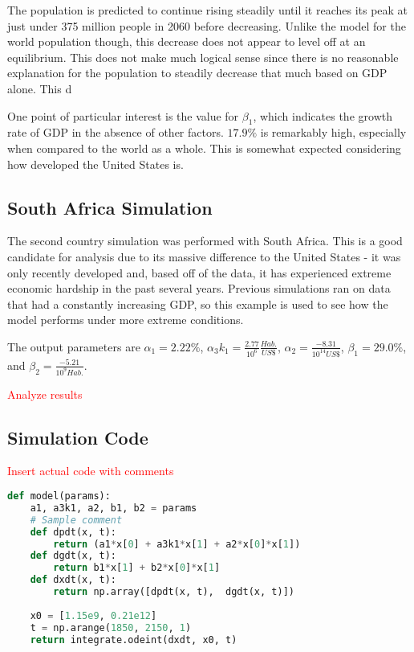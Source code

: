 \documentclass[a4paper]{article}
\newcommand{\todo}[1]{{\Large\textcolor{red}{#1}}}
\begin{document}
The population is predicted to continue rising steadily until it reaches its peak at just under 375 million people in 2060 before decreasing. Unlike the model for the world population though, this decrease does not appear to level off at an equilibrium. This does not make much logical sense since there is no reasonable explanation for the population to steadily decrease that much based on GDP alone. This d

One point of particular interest is the value for $\beta_1$, which indicates the growth rate of GDP in the absence of other factors. $17.9\%$ is remarkably high, especially when compared to the world as a whole. This is somewhat expected considering how developed the United States is. 

\subsection{South Africa Simulation}

The second country simulation was performed with South Africa. This is a good candidate for analysis due to its massive difference to the United States - it was only recently developed and, based off of the data, it has experienced extreme economic hardship in the past several years. Previous simulations ran on data that had a constantly increasing GDP, so this example is used to see how the model performs under more extreme conditions.

The output parameters are $\alpha_1 = 2.22\%$, $\alpha_3 k_1 = \frac{2.77}{10^{6}}\frac{Hab.}{US \$}$, $\alpha_2 = \frac{-8.31}{10^{14} US\$}$, $\beta_1 = 29.0\%$, and $\beta_2 = \frac{-5.21}{10^{9} Hab.}$.

\todo{Analyze results}

\newpage

\begin{appendices}
\section{Simulation Code}
\todo{Insert actual code with comments}

\begin{lstlisting}[language=Python]
def model(params):   
    a1, a3k1, a2, b1, b2 = params
    # Sample comment
    def dpdt(x, t):
        return (a1*x[0] + a3k1*x[1] + a2*x[0]*x[1])
    def dgdt(x, t):
        return b1*x[1] + b2*x[0]*x[1]
    def dxdt(x, t):
        return np.array([dpdt(x, t),  dgdt(x, t)])
    
    x0 = [1.15e9, 0.21e12]
    t = np.arange(1850, 2150, 1)
    return integrate.odeint(dxdt, x0, t)
\end{lstlisting}

\end{appendices}

\newpage

\nocite{*}


\end{document}

